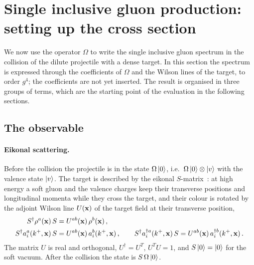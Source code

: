\section{Single inclusive gluon production: setting up the cross section}\label{sec:cross}

We now use the operator $\Omega$ to write the single inclusive gluon spectrum in the collision of the dilute projectile with a dense target. In this section the spectrum is expressed through the coefficients of $\Omega$ and the Wilson lines of the target, to order $g^4$; the coefficients are not yet inserted. The result is organised in three groups of terms, which are the starting point of the evaluation in the following sections.

\subsection{The observable}\label{sec:observable_def}

\paragraph{Eikonal scattering.} Before the collision the projectile is in the state $\Omega\ket0$, i.e.\ $\Omega\ket0\otimes\ket v$ with the valence state $\ket v$. The target is described by the eikonal $S$-matrix~\cite{Kovner:2005en,Lublinsky:2016meo}: at high energy a soft gluon and the valence charges keep their transverse positions and longitudinal momenta while they cross the target, and their colour is rotated by the adjoint Wilson line $U(\mathbf{x})$ of the target field at their transverse position,
\begin{align}\label{eq:Srotation}
S^\dagger\rho^a(\mathbf{x})\,S&=U^{ab}(\mathbf{x})\,\rho^b(\mathbf{x})\,,\notag\\
S^\dagger a^a_i(k^+,\mathbf{x})\,S&=U^{ab}(\mathbf{x})\,a^b_i(k^+,\mathbf{x})\,,\qquad
S^\dagger a^{\dagger a}_i(k^+,\mathbf{x})\,S=U^{ab}(\mathbf{x})\,a^{\dagger b}_i(k^+,\mathbf{x})\,.
\end{align}
The matrix $U$ is real and orthogonal, $U^\dagger=U^T$, $U^TU=1$, and $S\ket0=\ket0$ for the soft vacuum. After the collision the state is $S\,\Omega\ket0$.

